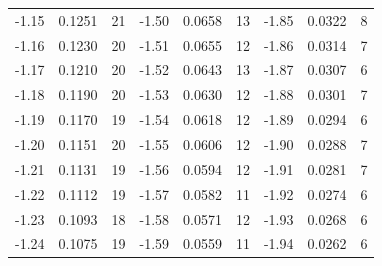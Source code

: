 \documentclass[russian, 12pt, fleqn,x11names]{article}
\begin{document}
\begin{center}
\begin{tabular}[b]{ | l | l |  l || l | l | l || l | l |  l |  }
-1.15&0.1251&21&-1.50&0.0658&13&-1.85&0.0322&8\\%
-1.16&0.1230&20&-1.51&0.0655&12&-1.86&0.0314&7\\%
-1.17&0.1210&20&-1.52&0.0643&13&-1.87&0.0307&6 \\%
-1.18&0.1190&20&-1.53&0.0630&12&-1.88&0.0301&7 \\%
-1.19&0.1170&19&-1.54&0.0618&12&-1.89&0.0294&6 \\%

-1.20&0.1151&20&-1.55&0.0606&12&-1.90&0.0288&7 \\%
-1.21&0.1131&19&-1.56&0.0594&12&-1.91&0.0281&7\\%
-1.22&0.1112&19&-1.57&0.0582&11&-1.92&0.0274&6 \\%
-1.23&0.1093&18&-1.58&0.0571&12&-1.93&0.0268&6 \\%
-1.24&0.1075&19&-1.59&0.0559&11&-1.94&0.0262&6 \\%
\hline
\end{tabular}\\
\end{center}
\newpage
\end{document}

